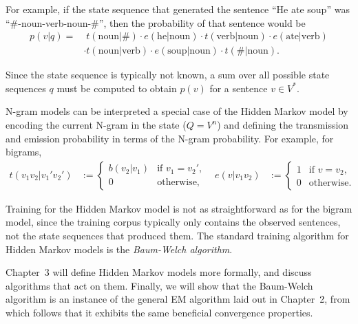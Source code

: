 For example, if the state sequence that generated the sentence ``He ate soup''
was ``\#-noun-verb-noun-\#'', then the probability of that sentence would be
\begin{align*}
 p(v|q)
  =&\; t(\text{noun}|\#) \cdot e(\text{he}|\text{noun}) \cdot t(\text{verb}|\text{noun}) \cdot e(\text{ate}|\text{verb}) \\
  &\cdot t(\text{noun}|\text{verb}) \cdot e(\text{soup}|\text{noun}) \cdot t(\#|\text{noun}).
\end{align*}

Since the state sequence is typically not known, a sum over all possible state
sequences $q$ must be computed to obtain $p(v)$ for a sentence $v\in V^*$.

N-gram models can be interpreted a special case of the Hidden Markov model by
encoding the current N-gram in the state ($Q = V^n$) and defining the
transmission and emission probability in terms of the N-gram probability. For
example, for bigrams,
\begin{align*}
 t(v_1v_2|v_1'v_2') &:= \begin{cases}
  b(v_2|v_1) & \text{if } v_1 = v_2', \\
  0 &\text{otherwise},
 \end{cases} &
 e(v|v_1v_2) &:= \begin{cases}
  1 & \text{if } v = v_2, \\
  0 &\text{otherwise}.
 \end{cases}
\end{align*}

Training for the Hidden Markov model is not as straightforward as for the
bigram model, since the training corpus typically only contains the observed
sentences, not the state sequences that produced them. The standard training
algorithm for Hidden Markov models is the \emph{Baum-Welch algorithm}.
\cite{baupetsouwei70,baum1972}

Chapter~3 will define Hidden Markov models more formally, and discuss
algorithms that act on them. Finally, we will show that the Baum-Welch
algorithm is an instance of the general EM algorithm laid out in Chapter~2,
from which follows that it exhibits the same beneficial convergence properties.
